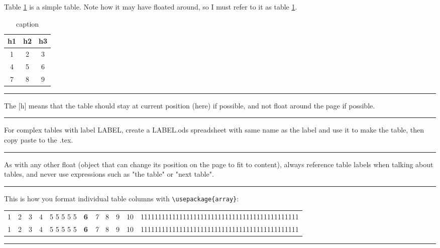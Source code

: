 \documentclass[12pt]{article}
\newcommand{\inOut}[1]{#1}                                %
\begin{document}
    \begin{example} \label{expTab1}
        Table \ref{tab1} is a simple table. Note how it may have floated around, so I must refer to it as table \ref{tab1}.
        \inOut{
            \begin{table}[h]
                \centering
                \begin{tabular}{ccc}
                    h1 & h2 & h3 \\
                    \hline
                    1 & 2 & 3 \\
                    4 & 5 & 6 \\
                    7 & 8 & 9 \\
                \end{tabular}
                \caption{caption}
                \label{tab1}
            \end{table}
        }
    \end{example}\hrule

    \begin{remark} \label{remTab1}
        The [h] means that the table should stay at current position (here) if possible, and not float around the page if possible.
    \end{remark}\hrule

    \begin{remark} \label{remTab2}
        For complex tables with label LABEL, create a LABEL.ods spreadsheet with same name as the label and use it to make the table, then copy paste to the .tex.
    \end{remark}\hrule

    \begin{remark} \label{remTab3}
        As with any other float (object that can change its position on the page to fit to content), always reference table labels when talking about tables, and never use expressions such as "the table" or "next table".
    \end{remark}\hrule

    \begin{example} \label{expTab2}
        This is how you format individual table columns with \lstinline|\usepackage{array}|:
        \inOut{
            \begin{table}[h]
                \centering
                \begin{tabular}{    l c rp{1cm} p{1cm} >{\bf}c >{\it}c | c || c @{ abc } c c}
                    1 & 2 & 3 & 4 & 5 5 5 5 5 & 6 & 7 & 8 & 9 & 10 & 111111111111111111111111111111111111111111111 \\
                    1 & 2 & 3 & 4 & 5 5 5 5 5 & 6 & 7 & 8 & 9 & 10 & 111111111111111111111111111111111111111111111 \\
                \end{tabular}
            \end{table}
        }
    \end{example}\hrule
\end{document}
